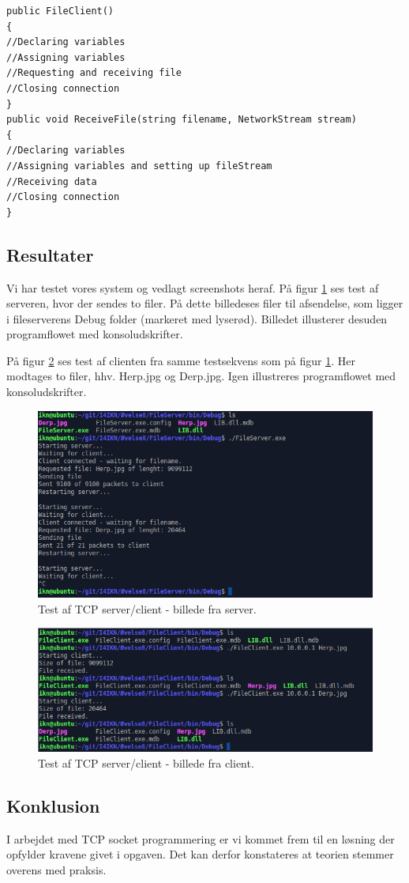 \begin{lstlisting}[caption = Hoveddesign for client,label=code:tcpClient]
public FileClient()
{
//Declaring variables
//Assigning variables
//Requesting and receiving file
//Closing connection
}
public void ReceiveFile(string filename, NetworkStream stream)
{
//Declaring variables
//Assigning variables and setting up fileStream
//Receiving data
//Closing connection
}
\end{lstlisting}

\subsection{Resultater}
Vi har testet vores system og vedlagt screenshots heraf. På figur \ref{fig:tcp_h1} ses test af serveren, hvor der sendes to filer. På dette billedeses filer til afsendelse, som ligger i fileserverens Debug folder (markeret med lyserød). Billedet illusterer desuden programflowet med konsoludskrifter.

På figur \ref{fig:tcp_h2} ses test af clienten fra samme testsekvens som på figur \ref{fig:tcp_h1}. Her modtages to filer, hhv. Herp.jpg og Derp.jpg. Igen illustreres programflowet med konsoludskrifter. 

\begin{figure}[H]
	\centering
	\includegraphics[width=0.9\linewidth]{figs/tcp_h1}
	\caption{Test af TCP server/client - billede fra server.}
	\label{fig:tcp_h1}
\end{figure}

\begin{figure}[H]
	\centering
	\includegraphics[width=0.9\linewidth]{figs/tcp_h2}
	\caption{Test af TCP server/client - billede fra client.}
	\label{fig:tcp_h2}
\end{figure}

\subsection{Konklusion}
I arbejdet med TCP socket programmering er vi kommet frem til en løsning der opfylder kravene givet i opgaven. Det kan derfor konstateres at teorien stemmer overens med praksis.